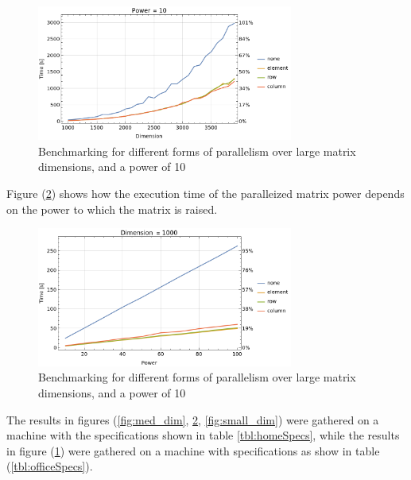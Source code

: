 \documentclass{article}
\begin{document}
    \begin{figure}[h!]
        \centering
        \includegraphics[width=0.75\textwidth]{images/big_dim.png}
        \caption{Benchmarking for different forms of parallelism over large matrix dimensions, and a power of 10}
        \label{fig:big_dim}
    \end{figure}

    Figure (\ref{fig:power}) shows how the execution time of the paralleized matrix power depends on the power to which the matrix is raised.

    \begin{figure}[h]
        \centering
        \includegraphics[width=0.75\textwidth]{images/power.png}
        \caption{Benchmarking for different forms of parallelism over large matrix dimensions, and a power of 10}
        \label{fig:power}
    \end{figure}

    The results in figures (\ref{fig:med_dim}, \ref{fig:power}, \ref{fig:small_dim}) were gathered on a machine with the specifications shown in table \ref{tbl:homeSpecs}, while the results in figure (\ref{fig:big_dim}) were gathered on a machine with specifications as show in table (\ref{tbl:officeSpecs}). 
\end{document}
